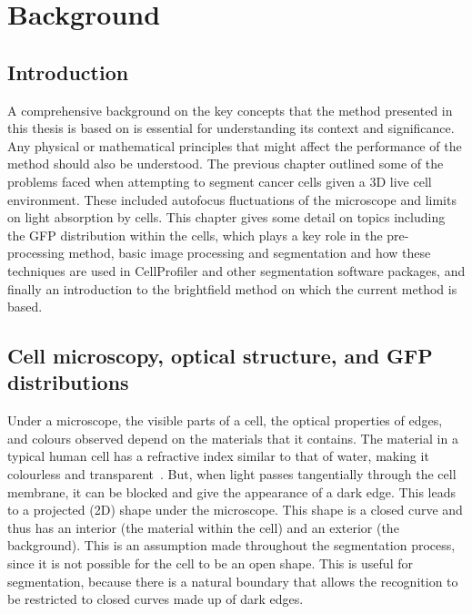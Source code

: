
\chapter{Background}

\ifpdf
    \graphicspath{{Chapter3/Figs/Raster/}{Chapter3/Figs/PDF/}{Chapter3/Figs/}}
\else
    \graphicspath{{Chapter3/Figs/Vector/}{Chapter3/Figs/}}
\fi

\section{Introduction}

A comprehensive background on the key concepts that the method presented in this thesis is based on is essential for understanding its context and significance. Any physical or mathematical principles that might affect the performance of the method should also be understood. The previous chapter outlined some of the problems faced when attempting to segment cancer cells given a 3D live cell environment. These included autofocus fluctuations of the microscope and limits on light absorption by cells. This chapter gives some detail on topics including the GFP distribution within the cells, which plays a key role in the pre-processing method, basic image processing and segmentation and how these techniques are used in CellProfiler and other segmentation software packages, and finally an introduction to the brightfield method on which the current method is based.

\section{Cell microscopy, optical structure, and GFP distributions}

Under a microscope, the visible parts of a cell, the optical properties of edges, and colours observed depend on the materials that it contains. The material in a typical human cell has a refractive index similar to that of water, making it colourless and transparent~\cite{Peters:90}. But, when light passes tangentially through the cell membrane, it can be blocked and give the appearance of a dark edge. This leads to a projected (2D) shape under the microscope. This shape is a closed curve and thus has an interior (the material within the cell) and an exterior (the background). This is an assumption made throughout the segmentation process, since it is not possible for the cell to be an open shape. This is useful for segmentation, because there is a natural boundary that allows the recognition to be restricted to closed curves made up of dark edges.

